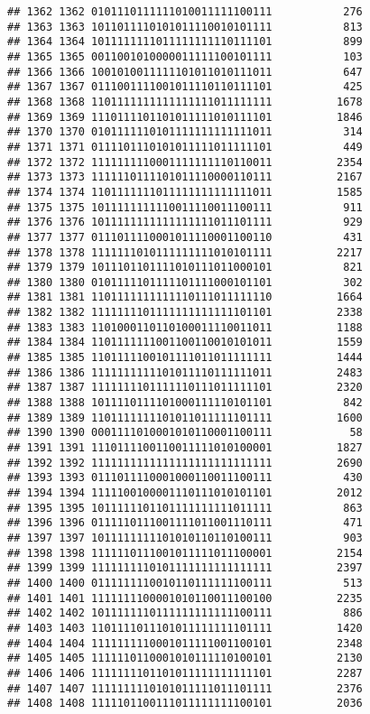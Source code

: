 \documentclass[]{article}
\begin{document}
\begin{verbatim}
## 1362 1362 0101110111111010011111100111           276
## 1363 1363 1011011110101011110010101111           813
## 1364 1364 1011111111011111111110111101           899
## 1365 1365 0011001010000011111100101111           103
## 1366 1366 1001010011111101011010111011           647
## 1367 1367 0111001111001011110110111101           425
## 1368 1368 1101111111111111111011111111          1678
## 1369 1369 1110111101101011111010111101          1846
## 1370 1370 0101111110101111111111111011           314
## 1371 1371 0111101110101011111011111101           449
## 1372 1372 1111111110001111111110110011          2354
## 1373 1373 1111110111101011110000110111          2167
## 1374 1374 1101111111011111111111111011          1585
## 1375 1375 1011111111110011110011100111           911
## 1376 1376 1011111111111111111011101111           929
## 1377 1377 0111011110001011110001100110           431
## 1378 1378 1111111010111111111010101111          2217
## 1379 1379 1011101101111010111011000101           821
## 1380 1380 0101111101111101111000101101           302
## 1381 1381 1101111111111110111011111110          1664
## 1382 1382 1111111101111111111111101101          2338
## 1383 1383 1101000110110100011110011011          1188
## 1384 1384 1101111111001100110010101011          1559
## 1385 1385 1101111100101111011011111111          1444
## 1386 1386 1111111111101011110111111011          2483
## 1387 1387 1111111101111110111011111101          2320
## 1388 1388 1011110111101000111110101101           842
## 1389 1389 1101111111101011011111101111          1600
## 1390 1390 0001111010001010110001100111            58
## 1391 1391 1110111100110011111010100001          1827
## 1392 1392 1111111111111111111111111111          2690
## 1393 1393 0111011110001000110011100111           430
## 1394 1394 1111100100001110111010101101          2012
## 1395 1395 1011111101101111111111011111           863
## 1396 1396 0111110111001111011001110111           471
## 1397 1397 1011111111101010110110100111           903
## 1398 1398 1111110111001011111011100001          2154
## 1399 1399 1111111110101111111111111111          2397
## 1400 1400 0111111110010110111111100111           513
## 1401 1401 1111111100001010110011100100          2235
## 1402 1402 1011111110111111111111100111           886
## 1403 1403 1101111011101011111111101111          1420
## 1404 1404 1111111110001011111001100101          2348
## 1405 1405 1111110110001010111110100101          2130
## 1406 1406 1111111101101011111111111101          2287
## 1407 1407 1111111110101011111011101111          2376
## 1408 1408 1111101100111011111111100101          2036

\end{verbatim}
\end{document}
